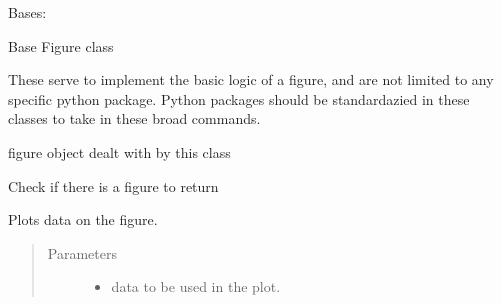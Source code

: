 \documentclass[letterpaper,10pt,english]{sphinxmanual}
\begin{document}
\begin{fulllineitems}
\label{\detokenize{dalio.external:dalio.external.image.Figure}}
Bases: {\hyperref[\detokenize{dalio.external:dalio.external.external.External}]{}}

Base Figure class

These serve to implement the basic logic of a figure, and are not limited
to any specific python package. Python packages should be standardazied
in these classes to take in these broad commands.

\begin{fulllineitems}
\label{\detokenize{dalio.external:dalio.external.image.Figure._connection}}
figure object dealt with by this class

\end{fulllineitems}


\begin{fulllineitems}
\label{\detokenize{dalio.external:dalio.external.image.Figure.check}}
Check if there is a figure to return

\end{fulllineitems}


\begin{fulllineitems}
\label{\detokenize{dalio.external:dalio.external.image.Figure.plot}}
Plots data on the figure.
\begin{quote}\begin{description}
\item[{Parameters}] \leavevmode\begin{itemize}
\item {} 
 \textendash{} data to be used in the plot.


\end{itemize}
\end{description}
\end{quote}
\end{fulllineitems}
\end{fulllineitems}
\end{document}
